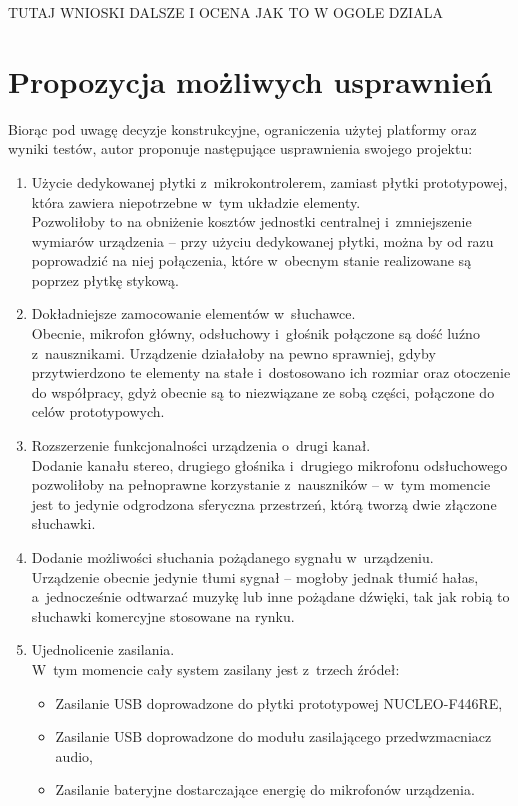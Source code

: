 TUTAJ WNIOSKI DALSZE I OCENA JAK TO W OGOLE DZIALA
\section{Propozycja możliwych usprawnień}
Biorąc pod uwagę decyzje konstrukcyjne, ograniczenia użytej platformy oraz wyniki testów, autor proponuje następujące usprawnienia swojego projektu:
\begin{enumerate}
	\item Użycie dedykowanej płytki z~mikrokontrolerem, zamiast płytki prototypowej, która zawiera niepotrzebne w~tym układzie elementy.\\
	Pozwoliłoby to na obniżenie kosztów jednostki centralnej i~zmniejszenie wymiarów urządzenia -- przy użyciu dedykowanej płytki, można by od razu poprowadzić na niej połączenia, które w~obecnym stanie realizowane są poprzez płytkę stykową.
	\item Dokładniejsze zamocowanie elementów w~słuchawce.\\
	Obecnie, mikrofon główny, odsłuchowy i~głośnik połączone są dość luźno z~nausznikami. Urządzenie działałoby na pewno sprawniej, gdyby przytwierdzono te elementy na stałe i~dostosowano ich rozmiar oraz otoczenie do współpracy, gdyż obecnie są to niezwiązane ze sobą części, połączone do celów prototypowych.
	\item Rozszerzenie funkcjonalności urządzenia o~drugi kanał.\\
	Dodanie kanału stereo, drugiego głośnika i~drugiego mikrofonu odsłuchowego pozwoliłoby na pełnoprawne korzystanie z~nauszników -- w~tym momencie jest to jedynie odgrodzona sferyczna przestrzeń, którą tworzą dwie złączone słuchawki.
	\item Dodanie możliwości słuchania pożądanego sygnału w~urządzeniu.\\
	Urządzenie obecnie jedynie tłumi sygnał -- mogłoby jednak tłumić hałas, a~jednocześnie odtwarzać muzykę lub inne pożądane dźwięki, tak jak robią to słuchawki komercyjne stosowane na rynku.
	\item Ujednolicenie zasilania.\\
	W~tym momencie cały system zasilany jest z~trzech źródeł:
	\begin{itemize}
	\item Zasilanie USB doprowadzone do płytki prototypowej NUCLEO-F446RE,
	\item Zasilanie USB doprowadzone do modułu zasilającego przedwzmacniacz audio,
	\item Zasilanie bateryjne dostarczające energię do mikrofonów urządzenia.

\end{itemize}
\end{enumerate}
